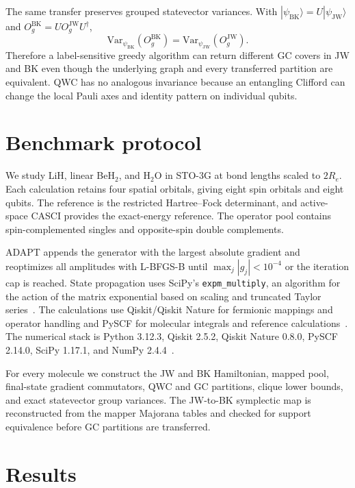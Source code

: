 \documentclass[aps,pra,twocolumn,superscriptaddress,nofootinbib,floatfix]{revtex4-2}
\begin{document}
The same transfer preserves grouped statevector variances. With $|\psi_{\mathrm{BK}}\rangle=U|\psi_{\mathrm{JW}}\rangle$ and $O_g^{\mathrm{BK}}=UO_g^{\mathrm{JW}}U^\dagger$,
\begin{equation}
 \mathrm{Var}_{\psi_{\mathrm{BK}}}(O_g^{\mathrm{BK}})
 =\mathrm{Var}_{\psi_{\mathrm{JW}}}(O_g^{\mathrm{JW}}).
 \label{eq:varinv}
\end{equation}
Therefore a label-sensitive greedy algorithm can return different GC covers in JW and BK even though the underlying graph and every transferred partition are equivalent. QWC has no analogous invariance because an entangling Clifford can change the local Pauli axes and identity pattern on individual qubits.

\section{Benchmark protocol}

We study LiH, linear BeH$_2$, and H$_2$O in STO-3G at bond lengths scaled to $2R_e$. Each calculation retains four spatial orbitals, giving eight spin orbitals and eight qubits. The reference is the restricted Hartree--Fock determinant, and active-space CASCI provides the exact-energy reference. The operator pool contains spin-complemented singles and opposite-spin double complements.

ADAPT appends the generator with the largest absolute gradient and reoptimizes all amplitudes with L-BFGS-B until $\max_j|g_j|<10^{-4}$ or the iteration cap is reached. State propagation uses SciPy's \texttt{expm\_multiply}, an algorithm for the action of the matrix exponential based on scaling and truncated Taylor series~\cite{almohy2011expmv,virtanen2020scipy}. The calculations use Qiskit/Qiskit Nature for fermionic mappings and operator handling and PySCF for molecular integrals and reference calculations~\cite{qiskit2024,sun2020pyscf}. The numerical stack is Python 3.12.3, Qiskit 2.5.2, Qiskit Nature 0.8.0, PySCF 2.14.0, SciPy 1.17.1, and NumPy 2.4.4~\cite{harris2020numpy}.

For every molecule we construct the JW and BK Hamiltonian, mapped pool, final-state gradient commutators, QWC and GC partitions, clique lower bounds, and exact statevector group variances. The JW-to-BK symplectic map is reconstructed from the mapper Majorana tables and checked for support equivalence before GC partitions are transferred.

\section{Results}
\end{document}

